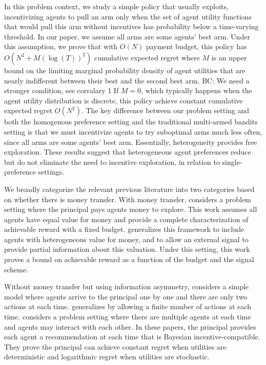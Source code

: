 \documentclass{article}
\newcommand{\bccomment}[1]{{\color{blue}BC: #1}}
\begin{document}

In this problem context, we study a simple policy that usually exploits, incentivizing agents to pull an arm only when the set of agent utility functions that would pull this arm without incentives has probability below a time-varying threshold. In our paper, we assume all arms are some agents' best arm. Under this assumption, we prove that with $O(N)$ payment budget, this policy has $O(N^2+M(\log(T))^2)$ cumulative expected regret where $M$ is an upper bound on the limiting marginal probability density of agent utilities that are nearly indifferent between their best and the second best arm. \bccomment{We need a stronger condition, see corralary 1} If $M=0$, which typically happens when the agent utility distribution is discrete, this policy achieve constant cumulative expected regret $O(N^2)$. The key difference between our problem setting and both the homogenous preference setting and the traditional multi-armed bandits setting is that we must incentivize agents to try suboptimal arms much less often, since all arms are some agents' best arm.  Essentially, heterogeneity provides free exploration.  These results suggest that heterogeneous agent preferences reduce but do not eliminate the need to incentive exploration, in relation to single-preference settings. 

We broadly categorize the relevant previous literature into two categories based on whether there is money transfer.
With money transfer, \cite{frazier2014incentivizing} considers a problem setting where the principal pays agents money to explore. This work assumes all agents have equal value for money and provide a complete characterization of achievable reward with a fixed budget. \cite{han2015incentivizing} generalizes this framework to include agents with heterogeneous value for money, and to allow an external signal to provide partial information about this valuation. Under this setting, this work proves a bound on achievable reward as a function of the budget and the signal scheme.

Without money transfer but using information asymmetry, \cite{kremer2014implementing} considers a simple model where agents arrive to the principal one by one and there are only two actions at each time. \cite{mansour2015bayesian} generalizes \cite{kremer2014implementing} by allowing a finite number of actions at each time. \cite{mansour2016bayesian} considers a problem setting where there are multiple agents at each time and agents may interact with each other. In these papers, the principal provides each agent a recommendation at each time that is Bayesian incentive-compatible. They prove the principal can achieve constant regret when utilities are deterministic and logarithmic regret when utilities are stochastic.
\end{document}
